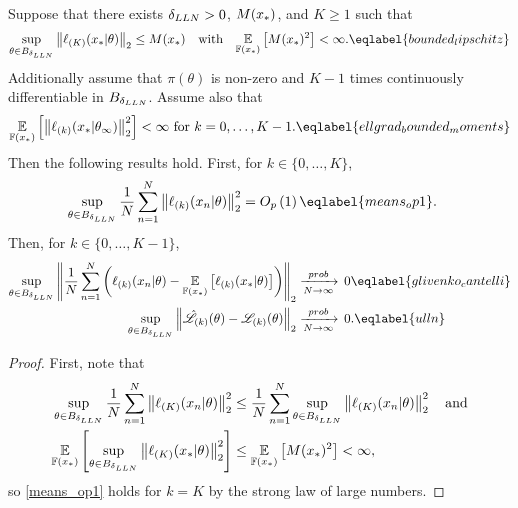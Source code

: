 \begin{lem}
%
Suppose that there exists $\delta_{LLN} > 0$, $M(x_{*})$, and $K \ge 1$ such that
%
\begin{align}
%
\sup_{\theta \in \thetaball{\deltaulln}}
    \norm{\ellgrad{K}(\xn \vert \theta)}_2 \le M(\xn)
\quad\textrm{with}\quad
\expect{\fdist(\xn)}{M(\xn)^2} < \infty.
\eqlabel{bounded_lipschitz}
%
\end{align}
%
Additionally assume that $\pi(\theta)$ is non-zero and $K-1$ times
continuously differentiable in $B_{\delta_{LLN}}$.  Assume also that
%
\begin{align}
    \expect{\fdist(\xn)}{\norm{\ellgrad{k}(\xn \vert \thetatrue)}^2_2} < \infty
    \textrm{ for }k=0,\ldots, K-1.
    \eqlabel{ellgrad_bounded_moments}
\end{align}
%
Then the following results hold.  First, for $k \in \{0, \ldots, K\}$,
%
\begin{align}
\sup_{\theta \in \thetaball{\deltaulln}}
    \meann \norm{\ellgrad{k}(\x_n \vert \theta)}_2^2
     &={} \ordp{1}
     \eqlabel{means_op1}.
%
\end{align}
%
Then, for $k \in \{0, \ldots, K - 1\}$,
%
\begin{align}
%
\sup_{\theta \in \thetaball{\deltaulln}}
    \norm{\meann \left( \ellgrad{k}(\x_n \vert \theta) -
           \expect{\fdist(\xn)}{\ellgrad{k}(\xn \vert \theta)} \right)
           }_2 &\plim{} 0
         \eqlabel{glivenko_cantelli} \\
%
%
\sup_{\theta \in \thetaball{\deltaulln}}
    \norm{\likhatk{k}(\theta) - \likk{k}(\theta)}_2 &\plim{} 0.
         \eqlabel{ulln}
%
\end{align}
%
\begin{proof}
%
First, note that
%
\begin{align*}
%
\sup_{\theta \in \thetaball{\deltaulln}}
    \meann \norm{\ellgrad{K}(\x_n \vert \theta)}_2^2 \le{}&
\meann \sup_{\theta \in \thetaball{\deltaulln}}
    \norm{\ellgrad{K}(\x_n \vert \theta)}_2^2
\quad\textrm{and}\\
\expect{\fdist(\xn)}{
    \sup_{\theta \in \thetaball{\deltaulln}}
        \norm{\ellgrad{K}(\xn \vert \theta)}^2_2
} \le{}& \expect{\fdist(\xn)}{M(\xn)^2} < \infty,
%
\end{align*}
%
so \eqref{means_op1} holds for $k = K$ by the strong law of large numbers.


\end{proof}
\end{lem}
